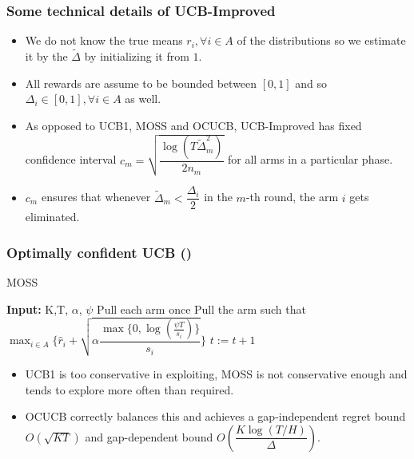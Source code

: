 \begin{frame}
\frametitle{Some technical details of UCB-Improved}
\begin{itemize}
\item<1-> We do not know the true means $r_i ,\forall i\in A$ of the distributions so we estimate it by the $\tilde{\Delta}$ by initializing it from $1$.
\item<2-> All rewards are assume to be bounded between $[0,1]$ and so $\Delta_{i}\in [0,1],\forall i\in A$ as well.
\item<3-> As opposed to UCB1, MOSS and OCUCB, UCB-Improved has fixed confidence interval  $c_{m}=\sqrt{\dfrac{\log{(T\tilde{\Delta}_{m}^{2})}}{2 n_{m}}}$ for all arms in a particular phase.
\item<4-> $c_m$ ensures that whenever $\tilde{\Delta}_{m}<\dfrac{\Delta_i}{2}$ in the $m$-th round, the arm $i$ gets eliminated.
\end{itemize}
\end{frame}

\begin{frame}
\frametitle{Optimally confident UCB (\cite{lattimore2015optimally})}
\begin{algorithm}[H]
\caption{MOSS}
\begin{algorithmic}[1]
\State \textbf{Input: } K,T, $\alpha$, $\psi$
\State Pull each arm once
\State Pull the arm such that $\max_{i\in A}\bigg\lbrace\hat{r}_{i} + \sqrt{\alpha\dfrac{\max\lbrace 0,\log(\frac{\psi T}{ s_i})\rbrace}{s_i}}\bigg\rbrace$
\State $t:=t+1 $
 \EndFor
\end{algorithmic}
\end{algorithm}
\begin{itemize}
\item<1-> UCB1 is too conservative in exploiting, MOSS is not conservative enough and tends to explore more often than required. 
\item<1-> OCUCB correctly balances this and achieves a gap-independent regret bound  $O\left(\sqrt{KT}\right)$ and gap-dependent bound $O \left(\dfrac{K\log (T/H)}{\Delta}\right)$.
\end{itemize}
\end{frame}

